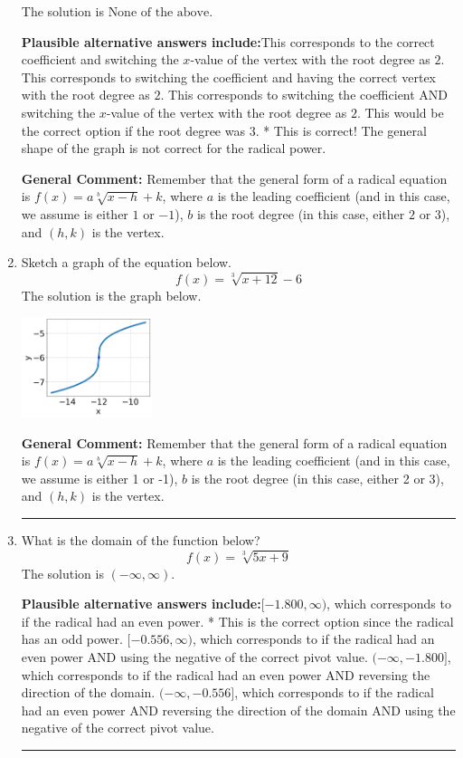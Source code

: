 \documentclass{extbook}[14pt]
\newcommand{\litem}[1]{\item #1

\rule{\textwidth}{0.4pt}}
\begin{document}
\begin{enumerate}
{The solution is \( \text{None of the above} \).\begin{enumerate}[label=\Alph*.]
\textbf{Plausible alternative answers include:}This corresponds to the correct coefficient and switching the $x$-value of the vertex with the root degree as $2$.
This corresponds to switching the coefficient and having the correct vertex with the root degree as $2$.
This corresponds to switching the coefficient AND switching the $x$-value of the vertex with the root degree as $2$.
This would be the correct option if the root degree was $3$.
* This is correct! The general shape of the graph is not correct for the radical power.
\end{enumerate}

\textbf{General Comment:} Remember that the general form of a radical equation is $ f(x) = a \sqrt[b]{x - h} + k$, where $a$ is the leading coefficient (and in this case, we assume is either $1$ or $-1$), $b$ is the root degree (in this case, either $2$ or $3$), and $(h, k)$ is the vertex.
}
\litem{
Sketch a graph of the equation below.
\[ f(x) = \sqrt[3]{x + 12} - 6 \]The solution is the graph below.
    \begin{center}
        \includegraphics[width=0.3\textwidth]{../Figures/radicalEquationToGraphCopyAB.png}
    \end{center}

\textbf{General Comment:} Remember that the general form of a radical equation is $ f(x) = a \sqrt[b]{x - h} + k $, where $a$ is the leading coefficient (and in this case, we assume is either 1 or -1), $b$ is the root degree (in this case, either 2 or 3), and $(h, k)$ is the vertex.
}
\litem{
What is the domain of the function below?
\[ f(x) = \sqrt[3]{5 x + 9} \]The solution is \( (-\infty, \infty) \).\begin{enumerate}[label=\Alph*.]
\textbf{Plausible alternative answers include:}$[-1.800, \infty)$, which corresponds to if the radical had an even power.
* This is the correct option since the radical has an odd power.
$[-0.556, \infty)$, which corresponds to if the radical had an even power AND using the negative of the correct pivot value.
$(-\infty, -1.800]$, which corresponds to if the radical had an even power AND reversing the direction of the domain.
$(-\infty, -0.556]$, which corresponds to if the radical had an even power AND reversing the direction of the domain AND using the negative of the correct pivot value.
\end{enumerate}

}
\end{enumerate}
\end{document}
